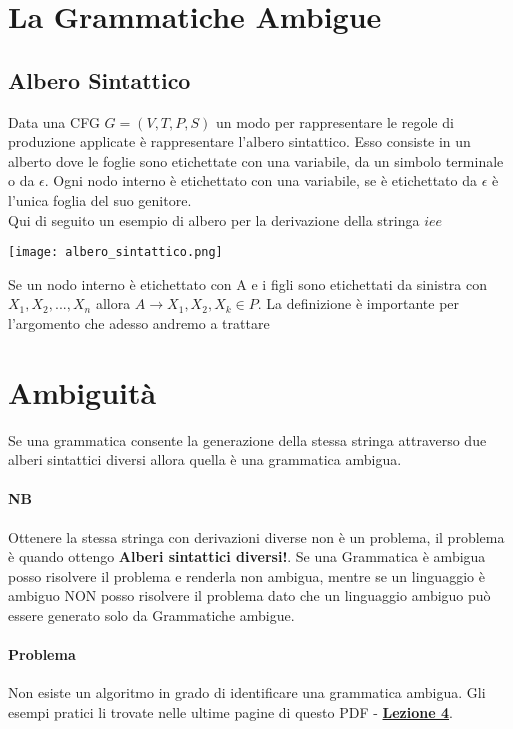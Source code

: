 \documentclass[12pt, a4paper, openany]{book}
\begin{document}
\section{La Grammatiche Ambigue}
\subsection{Albero Sintattico}
Data una CFG $G= (V,T,P,S)$ un modo per rappresentare le regole di produzione applicate è rappresentare l'albero sintattico.
Esso consiste in un alberto dove le foglie sono etichettate con una variabile, da un simbolo
terminale o da $\epsilon$. Ogni nodo interno è etichettato con una variabile, 
se è etichettato da $\epsilon$ è l'unica foglia del suo genitore.
\\ Qui di seguito un esempio di albero per la derivazione della stringa $iee$
\begin{center}
    \texttt{[image: albero\_sintattico.png]}
\end{center}
Se un nodo interno è etichettato con A e i figli sono etichettati da sinistra
con $X_1, X_2, ..., X_n$ allora $A \rightarrow X_1, X_2, X_k \in P$.
La definizione è importante per l'argomento che adesso andremo a trattare
\section*{Ambiguità}
Se una grammatica consente la generazione della stessa stringa attraverso due alberi sintattici
diversi allora quella è una grammatica ambigua.
\paragraph*{NB} Ottenere la stessa stringa con derivazioni diverse non è un problema,
il problema è quando ottengo \textbf{Alberi sintattici diversi!}.
Se una Grammatica è ambigua posso risolvere il problema e renderla non ambigua, mentre
se un linguaggio è ambiguo NON posso risolvere il problema dato che
un linguaggio ambiguo può essere generato solo da Grammatiche ambigue.
\paragraph*{Problema} Non esiste un algoritmo in grado di identificare una grammatica
ambigua. Gli esempi pratici li trovate nelle ultime pagine di questo PDF - 
{\href{https://drive.google.com/drive/folders/1gdH43dnEfCeLGmq08HEBwQoKORGgcQdY}{\textbf{Lezione 4}}}.
\end{document}
